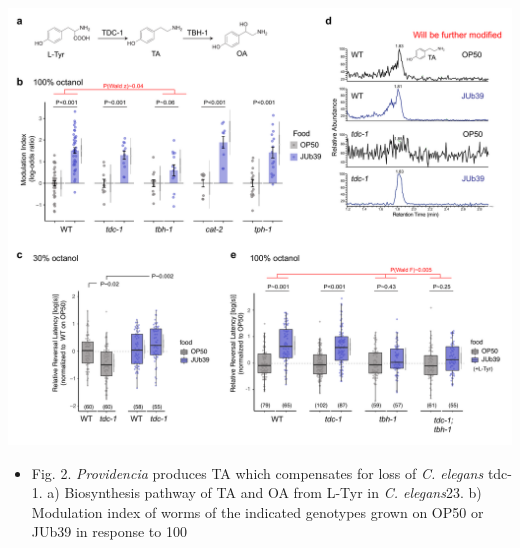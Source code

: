 \documentclass[]{article}
\begin{document}
\begin{center}\includegraphics[width=0.75\linewidth]{Figure_2vB6} \end{center}

\begin{itemize}
  \item[] Fig. 2. \textit{Providencia} produces TA which compensates for loss of \textit{C. elegans} tdc-1. 
a) Biosynthesis pathway of TA and OA from L-Tyr in \textit{C. elegans}23. b) Modulation index of worms of the indicated genotypes grown on OP50 or JUb39 in response to 100%
\end{itemize}
\end{document}

